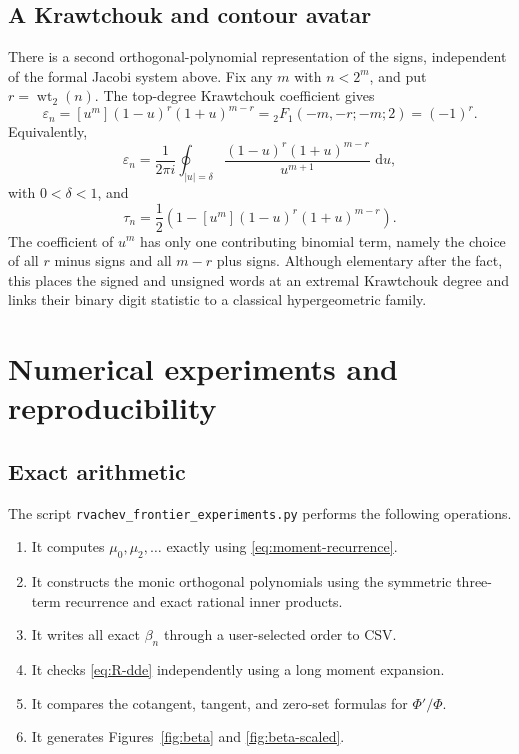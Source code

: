 \documentclass[11pt]{article}
\theoremstyle{definition}
\theoremstyle{remark}
\newcommand{\dd}{\,\mathrm d}
\newcommand{\wt}{\operatorname{wt}_2}
\newcommand{\eps}{\varepsilon}
\begin{document}
\subsection{A Krawtchouk and contour avatar}

There is a second orthogonal-polynomial representation of the signs, independent of the
formal Jacobi system above.  Fix any \(m\) with \(n<2^m\), and put
\(r=\wt(n)\).  The top-degree Krawtchouk coefficient \cite{Koekoek} gives
\begin{equation}
\boxed{
 \eps_n=[u^m](1-u)^r(1+u)^{m-r}
 ={}_2F_1(-m,-r;-m;2)=(-1)^r.}                             \label{eq:tm-krawtchouk}
\end{equation}
Equivalently,
\begin{equation}
 \eps_n=\frac1{2\pi i}\oint_{|u|=\delta}
 \frac{(1-u)^r(1+u)^{m-r}}{u^{m+1}}\,\dd u,               \label{eq:tm-krawtchouk-contour}
\end{equation}
with \(0<\delta<1\), and
\begin{equation}
 \tau_n=\frac12\left(1-[u^m](1-u)^r(1+u)^{m-r}\right).    \label{eq:tau-krawtchouk}
\end{equation}
The coefficient of \(u^m\) has only one contributing binomial term, namely the choice of
all \(r\) minus signs and all \(m-r\) plus signs.  Although elementary after the fact,
this places the signed and unsigned words at an extremal Krawtchouk degree and links their
binary digit statistic to a classical hypergeometric family.



\section{Numerical experiments and reproducibility}

\subsection{Exact arithmetic}

The script \texttt{rvachev\_frontier\_experiments.py} performs the following operations.

\begin{enumerate}
\item It computes \(\mu_0,\mu_2,\dots\) exactly using \eqref{eq:moment-recurrence}.
\item It constructs the monic orthogonal polynomials using the symmetric three-term
      recurrence and exact rational inner products.
\item It writes all exact \(\beta_n\) through a user-selected order to CSV.
\item It checks \eqref{eq:R-dde} independently using a long moment expansion.
\item It compares the cotangent, tangent, and zero-set formulas for \(\Phi'/\Phi\).
\item It generates Figures~\ref{fig:beta} and \ref{fig:beta-scaled}.
\end{enumerate}
\end{document}
